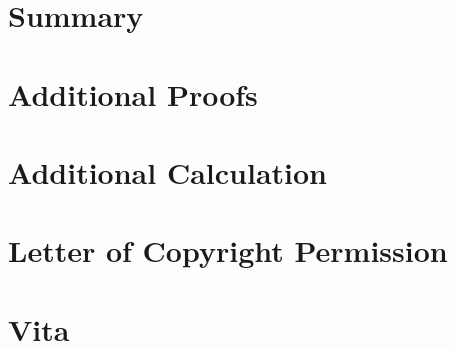 \documentclass[12pt,letterpaper]{lsuetdmod}
\numberwithin{thm}{chapter}
\numberwithin{lem}{chapter}
\numberwithin{cor}{chapter}
\numberwithin{defn}{chapter}
\numberwithin{cond}{chapter}
\numberwithin{rmk}{chapter}
\begin{document}
\chapter{Summary} \label{ch:sum-future}
\doublespacing
%
\pagebreak
\singlespacing


\appendix

\chapter{Additional Proofs}
\doublespacing
%
\pagebreak
\singlespacing


\chapter{Additional Calculation}
\doublespacing
%
\pagebreak
\singlespacing


\chapter{Letter of Copyright Permission}
\vspace{0.5em}
%
\pagebreak





\renewcommand{\bibname}{References\vspace{0.5em}}
%


\pagebreak
\singlespacing


\chapter*{Vita}
\doublespacing
\setlength{\parindent}{1.75em}
\vspace{0.2em}
%
\end{document}
